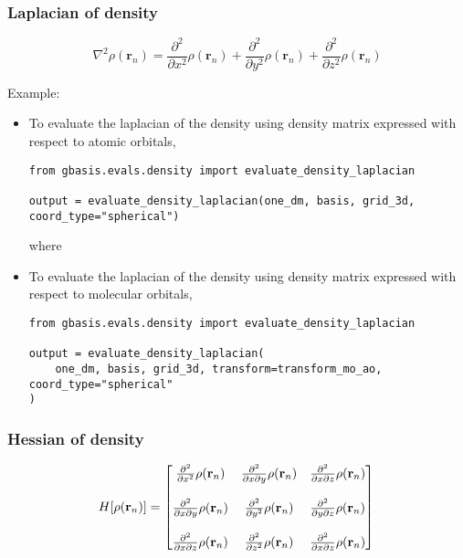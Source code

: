 \documentclass[letterpaper]{article}
\begin{document}
\subsubsection{Laplacian of density}
\begin{equation}
  \nabla^2 \rho(\mathbf{r}_n)
  =
  \frac{\partial^2}{\partial x^2} \rho(\mathbf{r}_n)
  + \frac{\partial^2}{\partial y^2} \rho(\mathbf{r}_n)
  + \frac{\partial^2}{\partial z^2} \rho(\mathbf{r}_n)
\end{equation}

Example:
\begin{itemize}
\item To evaluate the laplacian of the density using density matrix expressed
  with respect to atomic orbitals,
  \begin{lstlisting}[xleftmargin=-25pt]
from gbasis.evals.density import evaluate_density_laplacian

output = evaluate_density_laplacian(one_dm, basis, grid_3d, coord_type="spherical")
\end{lstlisting}
  where
\item To evaluate the laplacian of the density using density matrix expressed
  with respect to molecular orbitals,
  \begin{lstlisting}[xleftmargin=-25pt]
from gbasis.evals.density import evaluate_density_laplacian

output = evaluate_density_laplacian(
    one_dm, basis, grid_3d, transform=transform_mo_ao, coord_type="spherical"
)
\end{lstlisting}
\end{itemize}
\subsubsection{Hessian of density}
\begin{equation}
  H[\rho(\mathbf{r}_n)]
  =
  \begin{bmatrix}
    \frac{\partial^2}{\partial x^2} \rho(\mathbf{r}_n) &
    \frac{\partial^2}{\partial x \partial y} \rho(\mathbf{r}_n) &
    \frac{\partial^2}{\partial x \partial z} \rho(\mathbf{r}_n)\\\\
    \frac{\partial^2}{\partial x \partial y} \rho(\mathbf{r}_n) &
    \frac{\partial^2}{\partial y^2} \rho(\mathbf{r}_n)&
    \frac{\partial^2}{\partial y \partial z} \rho(\mathbf{r}_n)\\\\
    \frac{\partial^2}{\partial x \partial z} \rho(\mathbf{r}_n) &
    \frac{\partial^2}{\partial z^2} \rho(\mathbf{r}_n)&
    \frac{\partial^2}{\partial x \partial z} \rho(\mathbf{r}_n)\\
  \end{bmatrix}\\
\end{equation}
\end{document}
